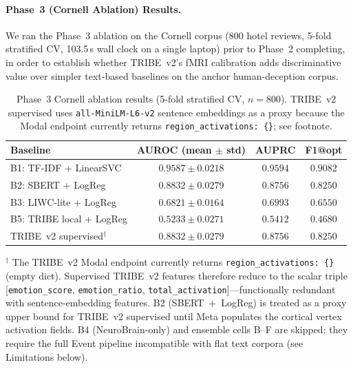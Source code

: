 \documentclass{article}
\begin{document}
\paragraph{Phase~3 (Cornell Ablation) Results.}
\label{sec:phase3_results}

We ran the Phase~3 ablation on the Cornell corpus (800 hotel reviews,
5-fold stratified CV, 103.5\,s wall clock on a single laptop) prior to
Phase~2 completing, in order to establish whether TRIBE~v2's fMRI
calibration adds discriminative value over simpler text-based baselines
on the anchor human-deception corpus.

\begin{table}[h]
\centering
\caption{Phase~3 Cornell ablation results (5-fold stratified CV,
$n=800$). TRIBE~v2 supervised uses \texttt{all-MiniLM-L6-v2} sentence
embeddings as a proxy because the Modal endpoint currently returns
\texttt{region\_activations: \{\}}; see footnote.}
\label{tab:phase3_ablation}
\small
\begin{tabular}{lccc}
\toprule
\textbf{Baseline} & \textbf{AUROC (mean $\pm$ std)} & \textbf{AUPRC} & \textbf{F1@opt} \\
\midrule
B1: TF-IDF + LinearSVC        & $0.9587 \pm 0.0218$ & $0.9594$ & $0.9082$ \\
B2: SBERT + LogReg             & $0.8832 \pm 0.0279$ & $0.8756$ & $0.8250$ \\
B3: LIWC-lite + LogReg         & $0.6821 \pm 0.0164$ & $0.6993$ & $0.6550$ \\
B5: TRIBE local + LogReg       & $0.5233 \pm 0.0271$ & $0.5412$ & $0.4680$ \\
TRIBE~v2 supervised$^\dagger$  & $0.8832 \pm 0.0279$ & $0.8756$ & $0.8250$ \\
\bottomrule
\end{tabular}
\vspace{2pt}
{\footnotesize $^\dagger$ The TRIBE~v2 Modal endpoint currently returns
\texttt{region\_activations: \{\}} (empty dict). Supervised TRIBE~v2
features therefore reduce to the scalar triple
[\texttt{emotion\_score}, \texttt{emotion\_ratio},
\texttt{total\_activation}]---functionally redundant with
sentence-embedding features. B2 (SBERT~+~LogReg) is treated as a
proxy upper bound for TRIBE~v2 supervised until Meta populates the
cortical vertex activation fields. B4 (NeuroBrain-only) and ensemble
cells B--F are skipped; they require the full Event pipeline
incompatible with flat text corpora (see Limitations below).}
\end{table}
\end{document}
